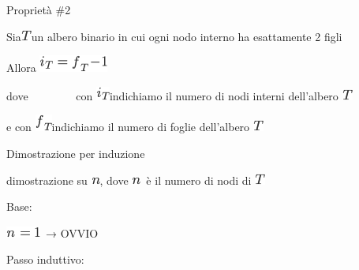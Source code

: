 \documentclass{article}
\begin{document}
{}

{}

{Proprietà \#2}

{}

{Sia}\includegraphics{images/image37.png}{un albero binario in cui ogni
nodo interno ha esattamente 2 figli}

{Allora }\includegraphics{images/image38.png}

{dove ~~~~~~~~con }\includegraphics{images/image39.png}{indichiamo il
numero di nodi interni dell'albero }\includegraphics{images/image37.png}

{e con }\includegraphics{images/image40.png}{indichiamo il numero di
foglie dell'albero }\includegraphics{images/image37.png}

{}

{}

{Dimostrazione per induzione}

{dimostrazione su }\includegraphics{images/image41.png}{, dove
}\includegraphics{images/image41.png}{~è il numero di nodi di
}\includegraphics{images/image37.png}

{}

{Base:}

\includegraphics{images/image42.png}{~→ OVVIO}

{}

{Passo induttivo:}
\end{document}
